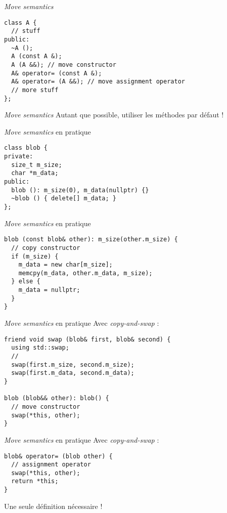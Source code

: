 \begin{frame}[fragile]{\textit{Move semantics}}
  \begin{lstlisting}[escapechar=ù]
class A {
  // stuff
public:
  ~A ();
  A (const A &);
  A (A &&); // move constructor
  A& operator= (const A &);
  A& operator= (A &&); // move assignment operator
  // more stuff
};
  \end{lstlisting}
\end{frame}

\begin{frame}{\textit{Move semantics}}
  Autant que possible, utiliser les méthodes par défaut !
\end{frame}

\begin{frame}[fragile]{\textit{Move semantics} en pratique}
  \begin{lstlisting}
class blob {
private:
  size_t m_size;
  char *m_data;
public:
  blob (): m_size(0), m_data(nullptr) {}
  ~blob () { delete[] m_data; }
};
  \end{lstlisting}
\end{frame}

\begin{frame}[fragile]{\textit{Move semantics} en pratique}
  \begin{lstlisting}
blob (const blob& other): m_size(other.m_size) {
  // copy constructor
  if (m_size) {
    m_data = new char[m_size];
    memcpy(m_data, other.m_data, m_size);
  } else {
    m_data = nullptr;
  }
}
  \end{lstlisting}
\end{frame}

\begin{frame}[fragile]{\textit{Move semantics} en pratique}
  Avec \textit{copy-and-swap} :
  
  \begin{lstlisting}
friend void swap (blob& first, blob& second) {
  using std::swap;
  //
  swap(first.m_size, second.m_size);
  swap(first.m_data, second.m_data);
}

blob (blob&& other): blob() {
  // move constructor
  swap(*this, other);
}
  \end{lstlisting}
\end{frame}

\begin{frame}[fragile]{\textit{Move semantics} en pratique}
  Avec \textit{copy-and-swap} :
  
  \begin{lstlisting}
blob& operator= (blob other) {
  // assignment operator
  swap(*this, other);
  return *this;
}
  \end{lstlisting}

  Une seule définition nécessaire !
\end{frame}